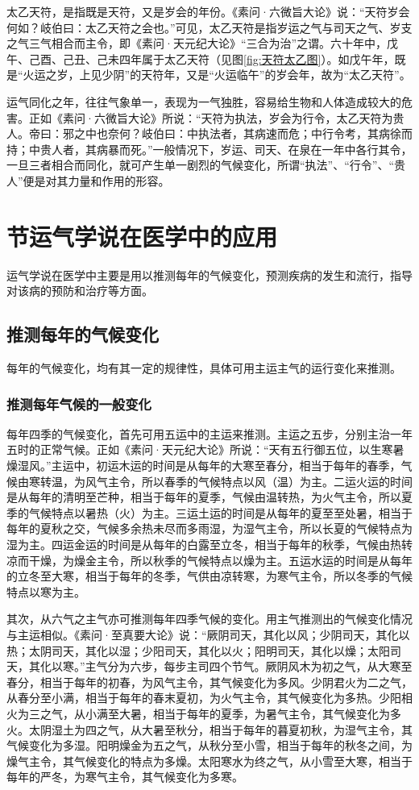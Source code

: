 \documentclass[12pt]{ctexbook}
\begin{document}
太乙天符，是指既是天符，又是岁会的年份。《素问·六微旨大论》说：“天符岁会何如？岐伯曰：太乙天符之会也。”可见，太乙天符是指岁运之气与司天之气、岁支之气三气相合而主令，即《素问·天元纪大论》“三合为治”之谓。六十年中，戊午、己酉、己丑、己未四年属于太乙天符（见图\ref{fig:天符太乙图}）。如戊午年，既是“火运之岁，上见少阴”的天符年，又是“火运临午”的岁会年，故为“太乙天符”。

运气同化之年，往往气象单一，表现为一气独胜，容易给生物和人体造成较大的危害。正如《素问·六微旨大论》所说：“天符为执法，岁会为行令，太乙天符为贵人。帝曰：邪之中也奈何？岐伯曰：中执法者，其病速而危；中行令考，其病徐而持；中贵人者，其病暴而死。”一般情况下，岁运、司天、在泉在一年中各行其令，一旦三者相合而同化，就可产生单一剧烈的气候变化，所谓“执法”、“行令”、“贵人”便是对其力量和作用的形容。

\section{节运气学说在医学中的应用}%

运气学说在医学中主要是用以推测每年的气候变化，预测疾病的发生和流行，指导对该病的预防和治疗等方面。

\subsection{推测每年的气候变化}%

每年的气候变化，均有其一定的规律性，具体可用主运主气的运行变化来推测。

\subsubsection{推测每年气候的一般变化}%

每年四季的气候变化，首先可用五运中的主运来推测。主运之五步，分别主治一年五时的正常气候。正如《素问·天元纪大论》所说：“天有五行御五位，以生寒暑燥湿风。”主运中，初运木运的时间是从每年的大寒至春分，相当于每年的春季，气候由寒转温，为风气主令，所以春季的气候特点以风（温）为主。二运火运的时间是从每年的清明至芒种，相当于每年的夏季，气候由温转热，为火气主令，所以夏季的气候特点以暑热（火）为主。三运土运的时间是从每年的夏至至处暑，相当于每年的夏秋之交，气候多余热未尽而多雨湿，为湿气主令，所以长夏的气候特点为湿为主。四运金运的时间是从每年的白露至立冬，相当于每年的秋季，气候由热转凉而干燥，为燥金主令，所以秋季的气候特点以燥为主。五运水运的时间是从每年的立冬至大寒，相当于每年的冬季，气供由凉转寒，为寒气主令，所以冬季的气候特点以寒为主。

其次，从六气之主气亦可推测每年四季气候的变化。用主气推测出的气候变化情况与主运相似。《素问·至真要大论》说：“厥阴司天，其化以风；少阴司天，其化以热；太阴司天，其化以湿；少阳司天，其化以火；阳明司天，其化以燥；太阳司天，其化以寒。”主气分为六步，每步主司四个节气。厥阴风木为初之气，从大寒至春分，相当于每年的初春，为风气主令，其气候变化为多风。少阴君火为二之气，从春分至小满，相当于每年的春末夏初，为火气主令，其气候变化为多热。少阳相火为三之气，从小满至大暑，相当于每年的夏季，为暑气主令，其气候变化为多火。太阴湿土为四之气，从大暑至秋分，相当于每年的暮夏初秋，为湿气主令，其气候变化为多湿。阳明燥金为五之气，从秋分至小雪，相当于每年的秋冬之间，为燥气主令，其气候变化的特点为多燥。太阳寒水为终之气，从小雪至大寒，相当于每年的严冬，为寒气主令，其气候变化为多寒。
\end{document}
